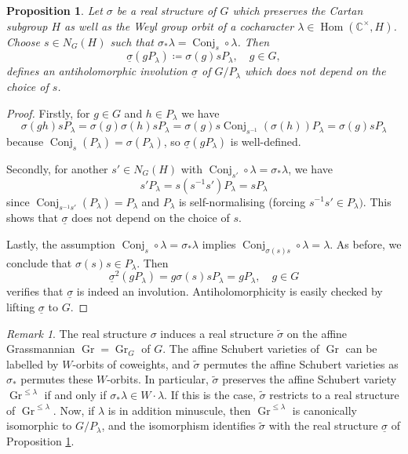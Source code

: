 \documentclass{amsart}
\newcommand{\C}{\mathbb{C}}
\newcommand{\Conj}{\operatorname{Conj}}
\newcommand{\Gr}{\operatorname{Gr}}
\newcommand{\Hom}{\operatorname{Hom}}
\newcommand{\inv}{^{-1}}
\theoremstyle{definition}
\theoremstyle{plain}
\newtheorem{prop}[defn]{Proposition}
\theoremstyle{remark}
\newtheorem{rmk}[defn]{Remark}
\begin{document}
\begin{prop}
\label{prop:underline_sigma}
    Let $\sigma$ be a real structure of $G$ which preserves the Cartan subgroup $H$ as well as the Weyl group orbit of a cocharacter $\lambda\in \Hom(\C^\times, H)$. Choose $s\in N_G(H)$ such that $\sigma_*\lambda = \Conj_s\circ \lambda$. Then
    $$
        \underline{\sigma}(gP_\lambda)
        \coloneqq
        \sigma(g)sP_\lambda,
        \quad
        g\in G,
    $$
    defines an antiholomorphic involution $\underline{\sigma}$ of $G/P_\lambda$ which does not depend on the choice of $s$.
\end{prop}
\begin{proof}
    Firstly, for $g\in G$ and $h\in P_\lambda$ we have
    $$
        \sigma(gh)sP_\lambda
        =
        \sigma(g)\sigma(h)sP_\lambda
        =
        \sigma(g)s \Conj_{s\inv}(\sigma(h)) P_\lambda
        =
        \sigma(g)s P_\lambda
    $$
    because $\Conj_s(P_\lambda) = \sigma(P_\lambda)$, so $\underline{\sigma}(gP_\lambda)$ is well-defined. 
    
    Secondly, for another $s'\in N_G(H)$ with $\Conj_{s'}\circ \lambda = \sigma_*\lambda$, we have
    $$
        s'P_\lambda
        =
        s(s\inv s')P_\lambda
        =
        sP_\lambda
    $$
    since $\Conj_{s\inv s'}(P_\lambda) = P_\lambda$ and $P_\lambda$ is self-normalising (forcing $s\inv s'\in P_\lambda)$. This shows that $\underline{\sigma}$ does not depend on the choice of $s$.

    Lastly, the assumption $\Conj_s \circ \lambda = \sigma_*\lambda$ implies $\Conj_{\sigma(s)s}\circ \lambda = \lambda$. As before, we conclude that $\sigma(s)s\in P_\lambda$. Then
    $$
        \underline{\sigma}^2(gP_\lambda)
        =
        g\sigma(s)sP_\lambda
        =
        gP_\lambda,
        \quad
        g\in G
    $$
    verifies that $\underline{\sigma}$ is indeed an involution. Antiholomorphicity is easily checked by lifting $\underline{\sigma}$ to $G$.
\end{proof}
\begin{rmk}
\label{rmk:real_str_on_affGr}
    The real structure $\sigma$ induces a real structure $\widetilde{\sigma}$ on the affine Grassmannian $\Gr = \Gr_G$ of $G$. The affine Schubert varieties of $\Gr$ can be labelled by $W$-orbits of coweights, and $\widetilde{\sigma}$ permutes the affine Schubert varieties as $\sigma_*$ permutes these $W$-orbits. In particular, $\widetilde{\sigma}$ preserves the affine Schubert variety $\Gr^{\le \lambda}$ if and only if $\sigma_*\lambda \in W\cdot \lambda$. If this is the case, $\widetilde{\sigma}$ restricts to a real structure of $\Gr^{\le \lambda}$. Now, if $\lambda$ is in addition minuscule, then $\Gr^{\le \lambda}$ is canonically isomorphic to $G/P_\lambda$, and the isomorphism identifies $\widetilde{\sigma}$ with the real structure $\underline{\sigma}$ of Proposition \ref{prop:underline_sigma}.
\end{rmk}
\end{document}
